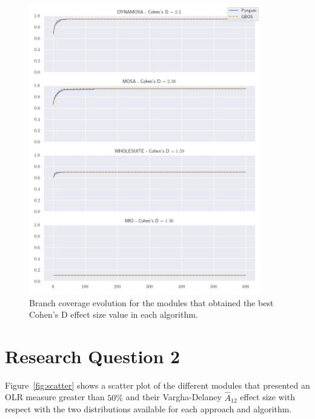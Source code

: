 \documentclass[%
  chapterprefix=false,%
  open=right,%
  twoside=true,%
  paper=a4,%
  logofile={Figures/logo.png},%
  thesistype=master,%
  UKenglish,%
]{se2thesis}
\begin{document}
\begin{figure}[htb]
  \centering
  \includegraphics[width=0.9\textwidth]{Figures/Results/bestES.jpg}
  \caption{Branch coverage evolution for the modules that obtained the best Cohen's D effect size value in each algorithm.}\label{fig:best}
\end{figure}

\newpage

\section{Research Question 2}

Figure~\ref{fig:scatter} shows a scatter plot of the different modules that presented an OLR measure greater than \(50\%\) and their Vargha-Delaney \(\hat{A}_{12}\) effect size with respect with the two distributions available for each approach and algorithm.
\end{document}
